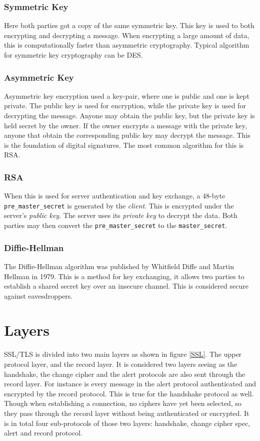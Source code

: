 \documentclass[11pt,a4paper, twocolumn]{article}
\begin{document}
\subsubsection{Symmetric Key} Here both parties got a copy of the same symmetric key. This key is used to both encrypting and decrypting a message. When encrypting a large amount of data, this is computationally faster than asymmetric cryptography. Typical algorithm for symmetric key cryptography can be DES.

\subsubsection{Asymmetric Key} Asymmetric key encryption used a key-pair, where one is public and one is kept private. The public key is used for encryption, while the private key is used for decrypting the message. Anyone may obtain the public key, but the private key is held secret by the owner. If the owner encrypts a message with the private key, anyone that obtain the corresponding public key may decrypt the message. This is the foundation of digital signatures. The most common algorithm for this is RSA.

\subsubsection{RSA}
When this is used for server authentication and key exchange, a 48-byte \texttt{pre\_master\_secret} is generated by the \textit{client}. This is encrypted under the server's \textit{public key}. The server uses its \textit{private key} to decrypt the data. Both parties may then convert the \texttt{pre\_master\_secret} to the \texttt{master\_secret}.

\subsubsection{Diffie-Hellman}
The Diffie-Hellman algorithm was published by Whitfield Diffe and Martin Hellman in 1979. This is a method for key exchanging, it allows two parties to establish a shared secret key over an insecure channel. This is considered secure against eavesdroppers.

\section{Layers}
SSL/TLS is divided into two main layers as shown in figure \ref{SSL}. The upper protocol layer, and the record layer. It is considered two layers seeing as the handshake, the change cipher and the alert protocols are also sent through the record layer. For instance is every message in the alert protocol authenticated and encrypted by the record protocol. This is true for the handshake protocol as well. Though when establishing a connection, no ciphers have yet been selected, so they pass through the record layer without being authenticated or encrypted. It is in total four sub-protocols of those two layers: handshake, change cipher spec, alert and record protocol.
\end{document}
